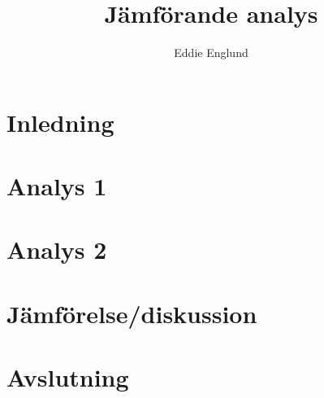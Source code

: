 \documentclass[12pt, 14]{article}
\title{Jämförande analys}
\author{Eddie Englund}
\begin{document}
    
    \maketitle

    \section{Inledning}
    \section{Analys 1}
    \section{Analys 2}
    \section{Jämförelse/diskussion}
    \section{Avslutning}
\end{document}
